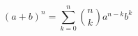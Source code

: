 \documentclass{article}
\begin{document}
\[
(a+b)^n=\sum_{k=0}^n {{n} \choose{k}}a^{n-k}b^k
\]
\end{document}
